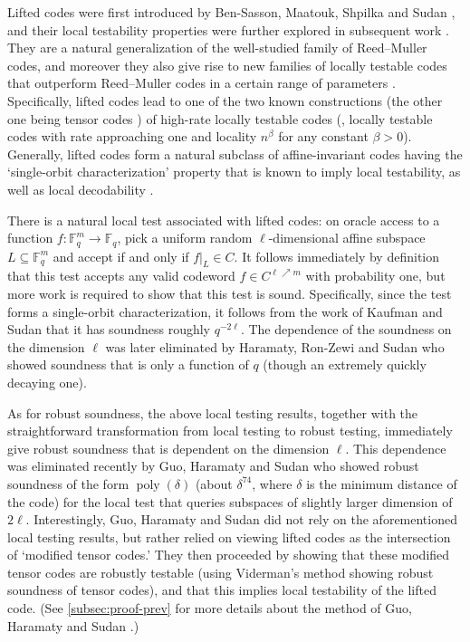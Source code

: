 \documentclass{toc}
\theoremstyle{plain}
\DeclareMathOperator{\poly}{poly} %
\newcommand{\F}{{\mathbb{F}}}
\begin{document}
Lifted codes were first introduced by Ben-Sasson, Maatouk, Shpilka and Sudan \cite{BenSassonMSS2011}, and their local testability properties were further explored in subsequent work  \cite{GuoKS2013,HaramatyRS2015,GuoHS2015}.
They are a natural generalization of the well-studied family of Reed--Muller codes, and moreover they also give rise to new families of locally testable codes that outperform Reed--Muller codes in a certain range of parameters \cite{GuoKS2013}. Specifically, lifted codes lead to one of the two known constructions (the other one being tensor codes \cite{BenSassonS2006,BenSassonV2015,Viderman2015,KoppartyMRS2017}) of high-rate locally testable codes (\ie, locally testable codes with rate approaching one and
%
%
locality $n^{\beta}$ for any constant $\beta>0$). 
%
Generally, lifted codes
form a natural subclass of affine-invariant codes %
%
having  %
the `single-orbit characterization' %
property that is known to imply local testability, as well as local decodability \cite{KaufmanS2008}.

There is a natural local test associated with lifted codes: on oracle access to a function $f: \F_q^m \to \F_q$, pick a uniform random $\ell$-dimensional affine subspace %
$L\subseteq \F_q^m$  %
and accept if and only if $f|_L \in C$. It follows immediately by definition that this test accepts any valid codeword $f \in C^{\ell \nearrow m}$ with probability one, but more work is required to show that this test is sound. Specifically, since the test forms a
%
single-orbit   %
characterization, it follows from  the work of Kaufman and Sudan \cite{KaufmanS2008} that it has soundness roughly $q^{- 2\ell}$. The dependence of the soundness on the dimension $\ell$ was later eliminated by Haramaty, Ron-Zewi and Sudan \cite{HaramatyRS2015} who showed soundness that is only a function of $q$ (though an extremely quickly decaying one).

As for robust soundness, the above local testing results, together with the straightforward transformation from local testing to robust testing, immediately give robust soundness that is dependent on the dimension $\ell$. This
dependence %
was eliminated recently by Guo, Haramaty and Sudan \cite{GuoHS2015} who showed robust soundness of the form $\poly(\delta)$ (about $\delta^{74}$,  where $\delta$ is the %
minimum     %
distance of the code) for the local test that queries subspaces of slightly larger dimension of $2\ell$. Interestingly,  Guo, Haramaty and Sudan \cite{GuoHS2015} did not rely on the aforementioned local testing results, but rather relied on viewing lifted codes as the intersection of
`modified tensor codes.'  %
They then proceeded by showing that these modified tensor codes are robustly testable (using %
Viderman's method   %
\cite{Viderman2015} showing robust soundness of tensor codes), and that this implies local testability of the lifted
%
code.  (See  %
\cref{subsec:proof-prev} for more details about the 
%
method of  Guo, %
Haramaty  %
and Sudan \cite{GuoHS2015}.) %
\end{document}
